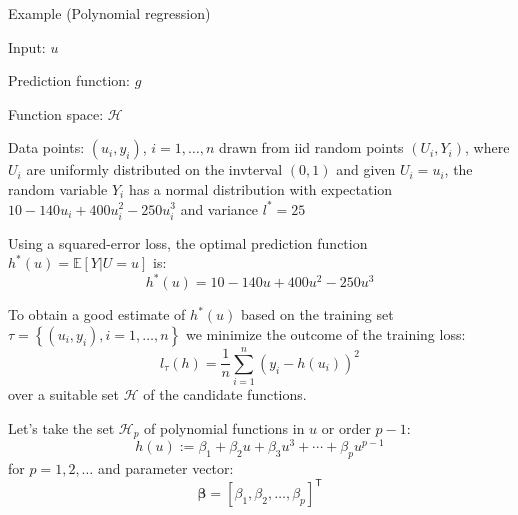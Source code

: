 Example (Polynomial regression)

Input: $u$

Prediction function: $g$

Function space: $\mathcal{H}$

Data points: $(u_{i}, y_{i})$, $i = 1, \ldots, n$
drawn from iid random points $(U_i, Y_i)$, where $U_{i}$ are uniformly distributed on the invterval
$(0,1)$ and given $U_i = u_i$, the random variable $Y_{i}$ has a normal 
distribution with expectation $10 - 140 u_i + 400u_{i}^{2} - 250u_{i}^3$ and variance
$l^{*} = 25$

Using a squared-error loss, the optimal prediction function
$h^{*}(u) = \mathbb{E}[ Y | U = u ]$ is:
\begin{equation*}
h^{*}(u) = 10 - 140u + 400u^2 - 250u^3
\end{equation*}

To obtain a good estimate of $h^{*}(u)$ based on the training set
$\tau = \left\{ (u_{i}, y_{i}), i = 1, \ldots, n \right\}$
we minimize the outcome of the training loss:
\begin{equation}
l_{\tau}(h) = \frac{1}{n} \sum_{i=1}^{n} \left( y_{i} - h(u_i) \right)^2
\end{equation}
over a suitable set $\mathcal{H}$ of the candidate functions.

Let's take the set $\mathcal{H}_{p}$ of polynomial functions in $u$
or order $p - 1$:
\begin{equation}
h(u) := \beta_{1} + \beta_{2} u + \beta_{3} u^3 + \cdots + \beta_{p} u^{p-1}
\end{equation}
for $p = 1,2,\ldots$ and parameter vector:
\begin{equation*}
\boldsymbol{\beta} = \left[ \beta_1, \beta_2, \ldots, \beta_{p} \right]^{\mathsf{T}}
\end{equation*}
